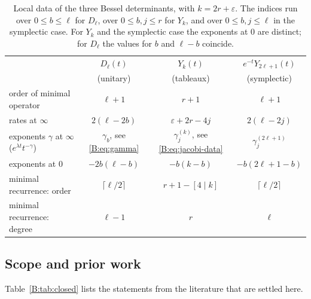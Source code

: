 \documentclass[11pt,a4paper]{article}
\theoremstyle{definition}
\theoremstyle{remark}
\newcommand{\cl}[1]{\lceil #1\rceil}
\numberwithin{equation}{section}
\begin{document}
\begin{table}[ht]
\centering
\small
\renewcommand{\arraystretch}{1.3}
\begin{tabular}{@{}lccc@{}}
\toprule
 & $D_\ell(t)$ & $Y_k(t)$ & $e^{-t}Y_{2\ell+1}(t)$\\
 & (unitary) & (tableaux) & (symplectic)\\
\midrule
order of minimal operator & $\ell+1$ & $r+1$ & $\ell+1$\\
rates at $\infty$ & $2(\ell-2b)$ & $\varepsilon+2r-4j$ & $2(\ell-2j)$\\
exponents $\gamma$ at $\infty$ ($e^{\lambda t}t^{-\gamma}$) & $\gamma_b$, see \eqref{B:eq:gamma} & $\gamma^{(k)}_j$, see \eqref{B:eq:jacobi-data} & $\gamma^{(2\ell+1)}_j$\\
exponents at $0$ & $-2b(\ell-b)$ & $-b(k-b)$ & $-b(2\ell+1-b)$\\
minimal recurrence: order & $\cl{\ell/2}$ & $r+1-[4\mid k]$ & $\cl{\ell/2}$\\
minimal recurrence: degree & $\ell-1$ & $r$ & $\ell$\\
\bottomrule
\end{tabular}
\medskip
\caption{Local data of the three Bessel determinants, with $k=2r+\varepsilon$. The indices run over $0\le b\le\ell$ for $D_\ell$, over $0\le b,j\le r$ for $Y_k$, and over $0\le b,j\le\ell$ in the symplectic case. For $Y_k$ and the symplectic case the exponents at $0$ are distinct; for $D_\ell$ the values for $b$ and $\ell-b$ coincide.}\label{B:tab:summary}
\end{table}

\subsection{Scope and prior work}
Table~\ref{B:tab:closed} lists the statements from the literature that are settled here.
\end{document}
